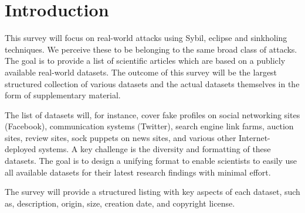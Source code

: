 \section{Introduction}

	This survey will focus on real-world attacks using Sybil, eclipse and sinkholing techniques. 
	We perceive these to be belonging to the same broad class of attacks. 
	The goal is to provide a list of scientific articles which are based on a publicly available real-world datasets. 
	The outcome of this survey will be the largest structured collection of various datasets and the actual datasets themselves in the form of supplementary material.
	
	The list of datasets will, for instance, cover fake profiles on social networking sites (Facebook), communication systems (Twitter), search engine link farms, auction sites, review sites, sock puppets on news sites, and various other Internet-deployed systems. 
	A key challenge is the diversity and formatting of these datasets. 
	The goal is to design a unifying format to enable scientists to easily use all available datasets for their latest research findings with minimal effort.
	
	The survey will provide a structured listing with key aspects of each dataset, such as, description, origin, size, creation date, and copyright license.